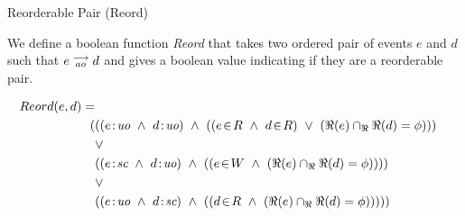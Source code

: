 \begin{definition}{Reorderable Pair (Reord)}
    \label{Reord}
    
    We define a boolean function \emph{Reord} that takes two ordered pair of events $e$ and $d$ such that $e\stackrel{\longrightarrow}{_{ao}}d$ and gives a boolean value indicating if they are a reorderable pair. 
    
    \begin{align*}
        Reord(e,d) = \\
        (
        &((\et{e}{uo} \ \wedge \ \et{d}{uo}) \ \wedge \ 
                (   
                    (\event{e}{R} \ \wedge \ \event{d}{R}) \ \vee \ 
                    (\Re(e) \cap_\Re \Re(d) = \phi) 
                )
        ) \\ &\vee \\
        &((\et{e}{sc} \ \wedge \ \et{d}{uo}) \ \wedge \ 
                (
                    (\event{e}{W} \ \wedge \ (\Re(e) \cap_\Re \Re(d) = \phi)) 
                )
        ) \\ &\vee \\
        &((\et{e}{uo} \ \wedge \ \et{d}{sc}) \ \wedge \ 
                (
                    (\event{d}{R} \ \wedge \ (\Re(e) \cap_\Re \Re(d) = \phi)) 
                )
        )
        )
    \end{align*}

\end{definition}

